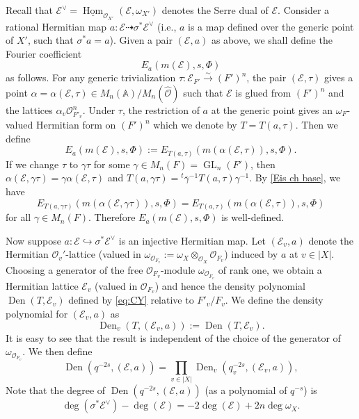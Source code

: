 \documentclass[reqno]{amsart}
\numberwithin{equation}{section}
\newcommand{\BA}{\ensuremath{\mathbb{A}}\xspace}
\newcommand{\ul}[1]{\underline{#1}}
\newcommand{\wh}[1]{\widehat{#1}}
\newcommand{\inj}{\hookrightarrow}
\DeclareMathOperator{\GL}{GL}
\DeclareMathOperator{\Hom}{Hom}
\DeclareMathOperator{\Den}{Den}
\newcommand{\isom}{\stackrel{\sim}{\to}}
\newcommand{\ov}{\overline}
\renewcommand\a\alpha
\newcommand\g\gamma
\newcommand{\s}{\sigma}
\renewcommand{\t}{\tau}
\newcommand{\om}{\omega}
\newcommand\cE{\mathcal{E}}
\newcommand\cO{\mathcal{O}}
\theoremstyle{remark}
\numberwithin{equation}{section}
\begin{document}
Recall that $\cE^\vee=\ul{\Hom}_{\cO_{X'}}(\cE,\omega_{X'})$ denotes the Serre dual of $\cE$. Consider a rational Hermitian map $a:\cE\dashrightarrow \s^{*}\cE^{\vee}$ (i.e., $a$ is a map defined over the generic point of $X'$, such that $\s^* a = a$). Given a pair $(\cE,a)$ as above, we shall define the Fourier coefficient
\begin{equation*}
E_{a}(m(\cE), s,\Phi)
\end{equation*}
as follows. For any generic trivialization $\t: \cE_{F'}\isom (F')^{n}$, the pair $(\cE,\t)$ gives a point $\a=\a(\cE,\t)\in M_n(\BA)/M_n(\wh\cO)$ such that $\cE$ is glued from $(F')^{n}$ and the lattices $\a_{v}\cO^{n}_{F'_{v}}$. Under $\t$, the restriction of $a$ at the generic point gives an $\om_{F}$-valued Hermitian form on $(F')^{n}$ which we denote by $T=T(a,\t)$. Then we define
\begin{equation}\label{eq:def Ea cE}
E_{a}(m(\cE), s,\Phi):=E_{T(a,\t)}(m(\a(\cE,\t)), s,\Phi).
\end{equation}
If we change $\t$ to $\g\t$ for some $\g\in M_{n}(F)=\GL_{n}(F')$, then $\a(\cE,\g\t)=\g\a(\cE,\t)$ and $T(a,\g\t)={}^{t}\ov\g^{-1}T(a,\t)\g^{-1}$. By  \eqref{Eis ch base}, we have
\begin{equation*}
E_{T(a,\g\t)}(m(\a(\cE,\g\t)), s,\Phi)=E_{T(a,\t)}(m(\a(\cE,\t)), s,\Phi)
\end{equation*}
for all $\g\in M_{n}(F)$. Therefore $E_{a}(m(\cE),s,\Phi)$ is well-defined.




Now suppose $a: \cE\inj \s^{*}\cE^\vee$ is an injective Hermitian map.  Let $(\cE_v,a)$ denote the Hermitian $\cO_{v}'$-lattice (valued in $\om_{\cO_{F_v}}:=\om_{X}\otimes_{\cO_{X}} \cO_{F_v}$) induced by $a$ at $v\in|X|$. Choosing a generator of the free $\cO_{F_v}$-module $\om_{\cO_{F_v}}$ of rank one, we obtain a Hermitian lattice $\cE_v$ (valued in  $\cO_{F_v}$) and hence  the density polynomial $\Den(T, \cE_v)$ defined by  \eqref{eq:CY}  relative to $F'_{v}/F_{v}$. We define   
 the density polynomial for $(\cE_v,a)$ as 
 \begin{equation}
 \label{def Den Ev}
 \Den_{v}(T, (\cE_v,a)):=\Den(T, \cE_v).
\end{equation} It is easy to see that the result is independent of the choice of the generator of  $\om_{\cO_{F_v}}$. 
We then define 
 $$
\Den(q^{-2s}, (\cE,a))=\prod_{v\in|X|} \Den_{v}(q_v^{-2s}, (\cE_v,a)),
$$
Note that the degree of $\Den(q^{-2s}, (\cE,a))$ (as a polynomial of $q^{-s}$) is $$\deg( \s^{*}\cE^\vee )-\deg(\cE)=-2\deg(\cE)+2n\deg\omega_X.$$
\end{document}
